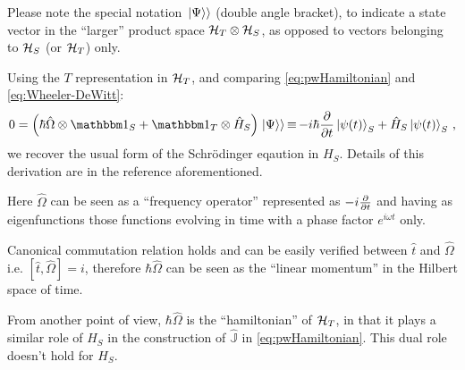 Please note the special notation $\left.\left| \Psi \right\rangle\right\rangle$ (double angle bracket),
to indicate a state vector in the ``larger'' product space $\mathcal{H}_T \otimes \mathcal{H}_S$,
as opposed to vectors belonging to $\mathcal{H}_S$ (or $\mathcal{H}_T$) only.

Using the $T$ representation in $\mathcal{H}_T$,
and comparing \eqref{eq:pwHamiltonian} and \eqref{eq:Wheeler-DeWitt}:
\begin{equation}\label{eq:schrod_from_pw}
  0 = \qty(\hbar\hat{\Omega}\ox\idop_S + \idop_{T}\ox\hat{H}_S)\dket{\Psi}
    \repr -i\hbar\pdv{t}\ket{\psi(t)}_{S} + \hat{H}_S\ket{\psi(t)}_{S}
    \,\text{,}
\end{equation}
we recover the usual form of the Schr\"{o}dinger eqaution in $H_S$.
Details of this derivation are in the reference aforementioned.

Here $\hat{\Omega}$ can be seen as a ``frequency operator''
represented as $-i\pdv{t}$ and having as eigenfunctions
those functions evolving in time with a phase factor $e^{i \omega t}$ only.

Canonical commutation relation holds and can be easily verified
between $\hat{t}$ and $\hat{\Omega}$
i.e. $[\hat{t}, \hat{\Omega}] = i$,
therefore $\hbar\hat{\Omega}$ can be seen as the ``linear momentum''
in the Hilbert space of time.

From another point of view, $\hbar\hat{\Omega}$ is the ``hamiltonian'' of $\mathcal{H}_T$,
in that it plays a similar role of $H_S$ in the construction of
$\hat{\mathbb{J}}$ in \eqref{eq:pwHamiltonian}. This dual role doesn't hold
for $H_S$. 

